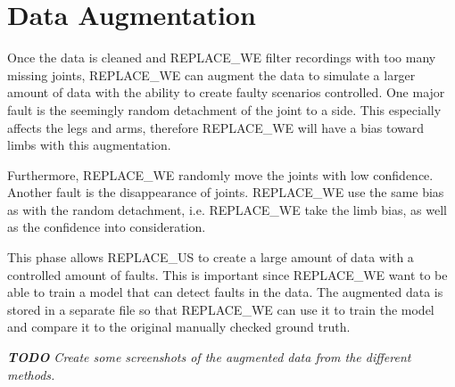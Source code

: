 \section{Data Augmentation}
\label{sec:data_augmentation}

Once the data is cleaned and REPLACE_WE filter recordings with too many missing joints, REPLACE_WE can augment the data to simulate a larger amount of data with the ability to create faulty scenarios controlled. One major fault is the seemingly random detachment of the joint to a side. This especially affects the legs and arms, therefore REPLACE_WE will have a bias toward limbs with this augmentation. 

Furthermore, REPLACE_WE randomly move the joints with low confidence. Another fault is the disappearance of joints. REPLACE_WE use the same bias as with the random detachment, i.e. REPLACE_WE take the limb bias, as well as the confidence into consideration.

This phase allows REPLACE_US to create a large amount of data with a controlled amount of faults. This is important since REPLACE_WE want to be able to train a model that can detect faults in the data. The augmented data is stored in a separate file so that REPLACE_WE can use it to train the model and compare it to the original manually checked ground truth.

\textit{\textbf{TODO} Create some screenshots of the augmented data from the different methods.}